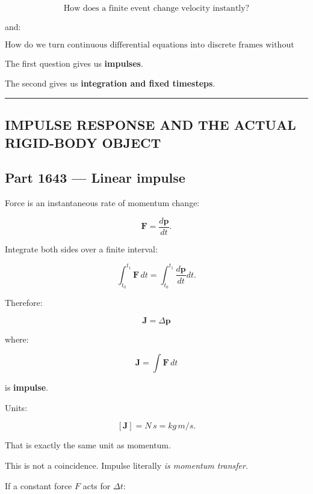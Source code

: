 \[
\boxed{\text{How does a finite event change velocity instantly?}}
\]

and:

\[
\boxed{\text{How do we turn continuous differential equations into discrete frames without destroying stability?}}
\]

The first question gives us \textbf{impulses}.

The second gives us \textbf{integration and fixed timesteps}.

\begin{center}\rule{0.5\linewidth}{0.5pt}\end{center}

\subsection{IMPULSE RESPONSE AND THE ACTUAL RIGID-BODY OBJECT}\label{06-engine-ii-ch036-impulse-response-and-the-actual-rigid-body-object}

\hypertarget{06-engine-ii-ch036-impulse-response-and-the-actual-rigid-body-object}{}

\subsection{Part 1643 --- Linear impulse}\label{06-engine-ii-ch036-part-1643-linear-impulse}

\hypertarget{06-engine-ii-ch036-part-1643-linear-impulse}{}

Force is an instantaneous rate of momentum change:

\[
\mathbf F=\frac{d\mathbf p}{dt}.
\]

Integrate both sides over a finite interval:

\[
\int_{t_0}^{t_1}\mathbf F\,dt
=
\int_{t_0}^{t_1}\frac{d\mathbf p}{dt}dt.
\]

Therefore:

\[
\boxed{
\mathbf J
=
\Delta\mathbf p
}
\]

where:

\[
\boxed{
\mathbf J
=
\int\mathbf F\,dt
}
\]

is \textbf{impulse}.

Units:

\[
[\mathbf J]
=
N\,s
=
kg\,m/s.
\]

That is exactly the same unit as momentum.

This is not a coincidence. Impulse literally \emph{is momentum transfer}.

If a constant force \(F\) acts for \(\Delta t\):

